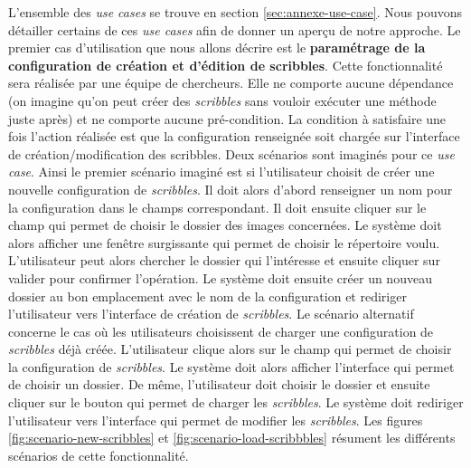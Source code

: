 \documentclass{article}
\begin{document}
L'ensemble des \textit{use cases} se trouve en section \ref{sec:annexe-use-case}. Nous pouvons détailler certains de ces \textit{use cases} afin de donner un aperçu de notre approche.
Le premier cas d'utilisation que nous allons décrire est le \textbf{paramétrage de la configuration de création et d'édition de scribbles}.
Cette fonctionnalité sera réalisée par une équipe de chercheurs. Elle ne comporte aucune dépendance (on imagine qu'on peut créer des \textit{scribbles} sans
vouloir exécuter une méthode juste après) et ne comporte aucune pré-condition. La condition à satisfaire une fois l'action réalisée est que
la configuration renseignée soit chargée sur l'interface de création/modification des scribbles.
Deux scénarios sont imaginés pour ce \textit{use case}. Ainsi le premier scénario imaginé est si l'utilisateur choisit de créer une nouvelle 
configuration de \textit{scribbles}. Il doit alors d'abord renseigner un nom pour la configuration dans le champs correspondant. Il doit ensuite
cliquer sur le champ qui permet de choisir le dossier des images concernées. Le système doit alors afficher une fenêtre surgissante
qui permet de choisir le répertoire voulu. L'utilisateur peut alors chercher le dossier qui l'intéresse et ensuite cliquer sur valider pour confirmer 
l'opération. Le système doit ensuite créer un nouveau dossier au bon emplacement avec le nom de la configuration et rediriger l'utilisateur
vers l'interface de création de \textit{scribbles}. Le scénario alternatif concerne le cas où les utilisateurs choisissent de charger une configuration
de \textit{scribbles} déjà créée. L'utilisateur clique alors sur le champ qui permet de choisir la configuration de \textit{scribbles}. Le système doit alors afficher 
l'interface qui permet de choisir un dossier. De même, l'utilisateur doit choisir le dossier et ensuite cliquer sur le bouton qui permet de charger les \textit{scribbles}.
Le système doit rediriger l'utilisateur vers l'interface qui permet de modifier les \textit{scribbles}.
Les figures \ref{fig:scenario-new-scribbles} et \ref{fig:scenario-load-scribbbles} résument les différents scénarios de cette fonctionnalité.\\
\end{document}

